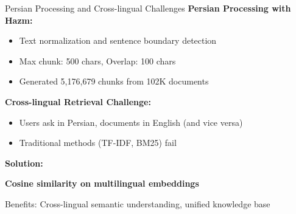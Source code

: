 \begin{frame}{Persian Processing and Cross-lingual Challenges}
    \textbf{Persian Processing with Hazm:}
    \begin{itemize}
        \item Text normalization and sentence boundary detection
        \item Max chunk: 500 chars, Overlap: 100 chars
        \item Generated 5,176,679 chunks from 102K documents
    \end{itemize}
    
    \vspace{0.5em}
    
    \textbf{Cross-lingual Retrieval Challenge:}
    \begin{itemize}
        \item Users ask in Persian, documents in English (and vice versa)
        \item Traditional methods (TF-IDF, BM25) fail
    \end{itemize}
    
    \vspace{0.5em}
    
    \textbf{Solution:}
    \begin{center}
        \colorbox{highlight!20}{\textbf{Cosine similarity on multilingual embeddings}}
    \end{center}
    
    Benefits: Cross-lingual semantic understanding, unified knowledge base
\end{frame}

